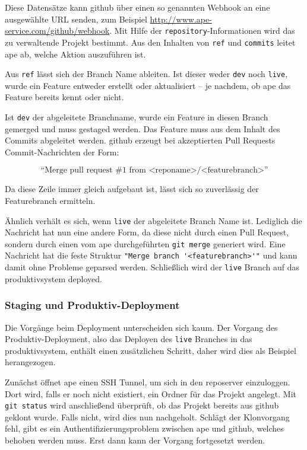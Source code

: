 Diese Datensätze kann \gls{github} über einen so genannten Webhook an eine ausgewählte URL senden, zum Beispiel \url{http://www.ape-service.com/github/webhook}. Mit Hilfe der \lstinline!repository!-Informationen wird das zu verwaltende Projekt bestimmt. Aus den Inhalten von \lstinline!ref! und \lstinline!commits! leitet \gls{ape} ab, welche Aktion auszuführen ist.

Aus \lstinline!ref! lässt sich der Branch Name ableiten. Ist dieser weder \lstinline!dev! noch \lstinline!live!, wurde ein Feature entweder erstellt oder aktualisiert -- je nachdem, ob \gls{ape} das Feature bereits kennt oder nicht.

Ist \lstinline!dev! der abgeleitete Branchname, wurde ein Feature in diesen Branch gemerged und muss gestaged werden. Das Feature muss aus dem Inhalt des Commits abgeleitet werden. \gls{github} erzeugt bei akzeptierten Pull Requests Commit-Nachrichten der Form:

\[
	\textrm{``Merge pull request \#1 from <reponame>/<featurebranch>''}
\]

Da diese Zeile immer gleich aufgebaut ist, lässt sich so zuverlässig der Featurebranch ermitteln.

Ähnlich verhält es sich, wenn \lstinline!live! der abgeleitete Branch Name ist. Lediglich die Nachricht hat nun eine andere Form, da diese nicht durch einen Pull Request, sondern durch einen vom \gls{ape} durchgeführten \lstinline!git merge! generiert wird. Eine Nachricht hat die feste Struktur \lstinline!"Merge branch '<featurebranch>'"! und kann damit ohne Probleme geparsed werden. Schließlich wird der \lstinline!live! Branch auf das \gls{produktivsystem} deployed.


\subsubsection{Staging und Produktiv-Deployment} %
\label{ssub:staging_und_produktiv_deployment}

Die Vorgänge beim Deployment unterscheiden sich kaum. Der Vorgang des Produktiv-Deployment, also das Deployen des \lstinline!live! Branches in das \gls{produktivsystem}, enthält einen zusätzlichen Schritt, daher wird dies als Beispiel herangezogen.

Zunächst öffnet \gls{ape} einen SSH Tunnel, um sich in den \gls{reposerver} einzuloggen. Dort wird, falls er noch nicht existiert, ein Ordner für das Projekt angelegt. Mit \lstinline!git status! wird anschließend überprüft, ob das Projekt bereits aus \gls{github} geklont wurde. Falls nicht, wird dies nun nachgeholt. Schlägt der Klonvorgang fehl, gibt es ein Authentifizierungsproblem zwischen \gls{ape} und \gls{github}, welches behoben werden muss. Erst dann kann der Vorgang fortgesetzt werden.

